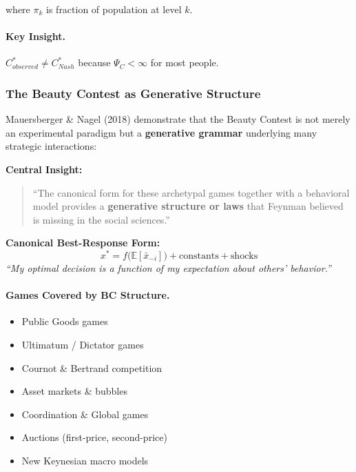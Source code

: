 where $\pi_k$ is fraction of population at level $k$.

\paragraph{Key Insight.}
$C^*_{observed} \neq C^*_{Nash}$ because $\Psi_C < \infty$ for most people.

\subsubsection{The Beauty Contest as Generative Structure}

Mauersberger \& Nagel (2018) demonstrate that the Beauty Contest is not merely an experimental paradigm
but a \textbf{generative grammar} underlying many strategic interactions:

\begin{tcolorbox}[colback=yellow!5!white, colframe=yellow!75!black,
    title=\textbf{Mauersberger \& Nagel (2018): BC as Generative Framework}]

\textbf{Central Insight:}
\begin{quote}
``The canonical form for these archetypal games together with a behavioral model
provides a \textbf{generative structure or laws} that Feynman believed is missing
in the social sciences.''
\end{quote}

\textbf{Canonical Best-Response Form:}
\[
x^* = f\bigl(\mathbb{E}[\bar{x}_{-i}]\bigr) + \text{constants} + \text{shocks}
\]
\textit{``My optimal decision is a function of my expectation about others' behavior.''}

\end{tcolorbox}

\paragraph{Games Covered by BC Structure.}
\begin{itemize}[nosep]
    \item Public Goods games
    \item Ultimatum / Dictator games
    \item Cournot \& Bertrand competition
    \item Asset markets \& bubbles
    \item Coordination \& Global games
    \item Auctions (first-price, second-price)
    \item New Keynesian macro models
\end{itemize}

